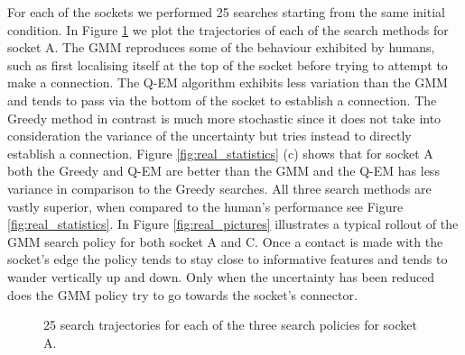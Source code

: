 \documentclass[final,3p,times,twocolumn]{elsarticle}
\begin{document}
For each of the sockets we performed 25 searches starting from the same initial condition. In Figure \ref{fig:real_policy} we plot
the trajectories of each of the search methods for socket A. The GMM reproduces some of the behaviour exhibited by humans, such as 
first localising itself at the top of the socket before trying to attempt to make a connection. The Q-EM algorithm exhibits less variation
than the GMM and tends to pass via the bottom of the socket to establish a connection. The Greedy method in contrast is much more  
stochastic since it does not take into consideration the variance of the uncertainty but tries instead to directly establish a connection.
Figure \ref{fig:real_statistics} (c) shows that for socket A both the Greedy and Q-EM are better than the GMM and the Q-EM has less
variance in comparison to the Greedy searches.  All three search methods are vastly superior, when compared to the human's performance 
see Figure \ref{fig:real_statistics}.  In Figure \ref{fig:real_pictures} illustrates a typical rollout of the GMM search policy for both 
socket A and C. Once a contact is made with the socket's edge the policy tends to stay close to informative features and tends to 
wander vertically up and down. Only when the uncertainty has been reduced does the GMM policy try to go towards the socket's connector. 

\begin{figure}
 \centering
    \caption{%
    25 search trajectories for each of the three search policies for socket A. }
    \label{fig:real_policy}
\end{figure}
\end{document}
